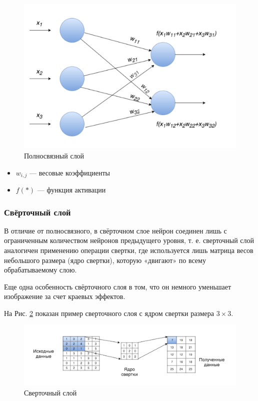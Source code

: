 \begin{figure}[h]
    \centering
    \includegraphics [width=\textwidth*2/3] {images/fc_layer.png}
    \caption{Полносвязный слой}
    \label{fig:fc_layer}
\end{figure}

\begin{itemize}
    \item $w_{i,j}$ — весовые коэффициенты
    \item $f(*)$ — функция активации
\end{itemize}

\subsubsection{Свёрточный слой} \label{conv_layers}
В отличие от полносвязного, в свёрточном слое нейрон соединен лишь с ограниченным количеством нейронов предыдущего уровня, т. е. сверточный слой аналогичен применению операции свертки, где используется лишь матрица весов небольшого размера (ядро свертки), которую «двигают» по всему обрабатываемому слою.

Еще одна особенность свёрточного слоя в том, что он немного уменьшает изображение за счет краевых эффектов.

На Рис. \ref{fig:conv_layer} показан пример сверточного слоя с ядром свертки размера $3 \times 3$.
\begin{figure}[h]
    \centering
    \includegraphics [width=\textwidth*2/3] {images/conv_layer.png}
    \caption{Сверточный слой}
    \label{fig:conv_layer}
\end{figure}

